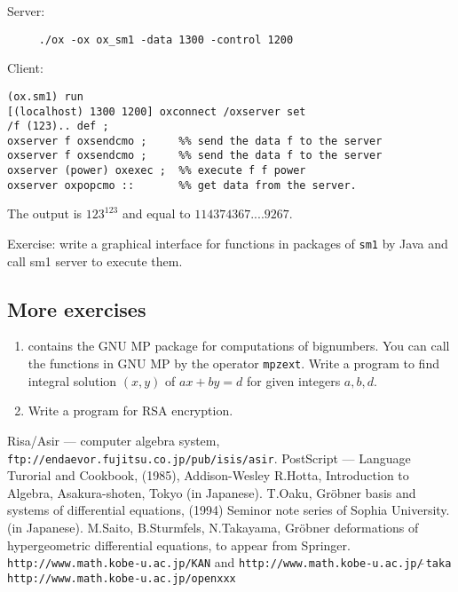 \noindent Server:
\begin{verbatim}
     ./ox -ox ox_sm1 -data 1300 -control 1200 
\end{verbatim}

\noindent Client:
\begin{verbatim}
(ox.sm1) run
[(localhost) 1300 1200] oxconnect /oxserver set
/f (123).. def ;
oxserver f oxsendcmo ;     %% send the data f to the server
oxserver f oxsendcmo ;     %% send the data f to the server
oxserver (power) oxexec ;  %% execute f f power
oxserver oxpopcmo ::       %% get data from the server.
\end{verbatim}
The output is $123^{123}$ and equal to
$114374367....9267$.


\noindent
Exercise:
write a graphical interface for functions in packages of {\tt sm1} by Java
and call sm1 server to execute them.

\subsection{More exercises}

\begin{enumerate}
\item \kansm contains the GNU MP package for computations of bignumbers.
You can call the functions in GNU MP by the operator {\tt mpzext}.
Write a program to find integral solution $(x,y)$ of
$ a x + b y = d$ for given integers $a, b, d$.
\item Write a program for RSA encryption.
\end{enumerate}

\begin{thebibliography}{99}
 Risa/Asir --- computer algebra system, \hfill\break
{\tt ftp://endaevor.fujitsu.co.jp/pub/isis/asir}.
 PostScript --- Language Turorial and Cookbook,
(1985), Addison-Wesley
 R.Hotta, Introduction to Algebra, Asakura-shoten, Tokyo
(in Japanese).
 T.Oaku, 
Gr\"obner basis and systems of differential equations,
(1994) Seminor note series of Sophia University.
(in Japanese).
M.Saito, B.Sturmfels, N.Takayama,
Gr\"obner deformations of hypergeometric differential equations,
to appear from Springer.
 {\tt http://www.math.kobe-u.ac.jp/KAN} and \hfill\break
{\tt http://www.math.kobe-u.ac.jp/$\tilde{\ }$taka}
{\tt http://www.math.kobe-u.ac.jp/openxxx}
\end{thebibliography}




